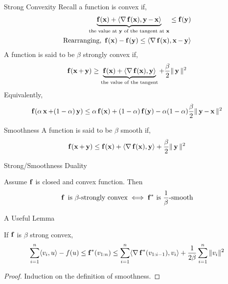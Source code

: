 \begin{frame}{Strong Convexity}
  Recall a function is convex if,
  \begin{align*} 
    \underbrace{\f(\x) + \dotprod{\grad \f(\x)}{\y-\x}}_{\text{the value at $\y$ of the tangent at $\x$}} \le \f(\y) \\
    \text{Rearranging, } \f(\x)-\f(\y) \le \dotprod{\grad \f(\x)} {\x-\y} \\
  \end{align*}
  A function is said to be $\beta$ strongly convex if,
  \begin{align*}
    \f(\x+\y) \ge \underbrace{\f(\x) + \dotprod{\grad \f(\x)}{\y}}_{\text{the value of the tangent}} +\frac{\beta}{2} \|\y\|^2
  \end{align*}
  Equivalently,
  \begin{align*}
    \f(\alpha \x +(1-\alpha)\y) \le \alpha \f(\x) + (1-\alpha)\f(\y) - \alpha(1-\alpha)\frac{\beta}{2} \|\y-\x\|^2
  \end{align*}
\end{frame}

\begin{frame}{Smoothness}
  A function is said to be $\beta$ smooth if,
  \begin{align*}
    \f(\x+\y) \le \f(\x) + \dotprod{\grad \f(\x)}{\y} +\frac{\beta}{2} \|\y\|^2
  \end{align*}
\end{frame}

\begin{frame}{Strong/Smoothness Duality}
  \begin{theorem}
    Assume $\f$ is closed and convex function. Then
    \begin{align*}
      \f \text{ is } \beta\text{-strongly convex} \iff \opt{\f} \text{ is } \frac{1}{\beta}\text{-smooth}
    \end{align*}
  \end{theorem}
\end{frame}

\begin{frame}{A Useful Lemma}
  \begin{lemma}
    If $\f$ is $\beta$ strong convex,
    \begin{align*}
      \sum_{i=1}^n \dotprod{v_i}{u} - f(u) \le \opt{\f}(v_{1:n}) \le \sum_{i=1}^n \dotprod{\grad \opt{\f}(v_{1:i-1})}{v_i} +\frac{1}{2\beta} \sum_{i=1}^n \|v_i\|^2
    \end{align*}
  \end{lemma}
  \begin{proof}
    Induction on the definition of smoothness.
  \end{proof}
\end{frame}

